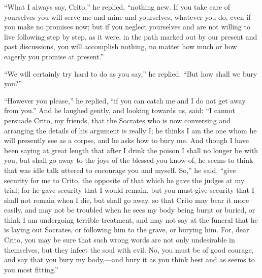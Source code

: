 \documentclass[letterpaper,12pt]{article}
\newcommand{\stephpag}[1]{\marginnote{\small\itshape\fontfamily{ppl}\selectfont #1}}
\begin{document}
\begin{drama}
``What I always say, Crito,'' he replied, ``nothing new. If you take care of yourselves you will serve me and mine and yourselves, whatever you do, even if you make no promises now; but if you neglect yourselves and are not willing to live following step by step, as it were, in the path marked out by our present and past discussions, you will accomplish nothing, \stephpag{c} no matter how much or how eagerly you promise at present.''
 
``We will certainly try hard to do as you say,'' he replied. ``But how shall we bury you?''
 
``However you please,'' he replied, ``if you can catch me and I do not get away from you.'' And he laughed gently, and looking towards us, said: ``I cannot persuade Crito, my friends, that the Socrates who is now conversing and arranging the details of his argument is really I; he thinks I am the one whom he will presently see as a corpse, \stephpag{d} and he asks how to bury me. And though I have been saying at great length that after I drink the poison I shall no longer be with you, but shall go away to the joys of the blessed you know of, he seems to think that was idle talk uttered to encourage you and myself. So,'' he said, ``give security for me to Crito, the opposite of that which he gave the judges at my trial; for he gave security that I would remain, but you must give security that I shall not remain when I die, \stephpag{e} but shall go away, so that Crito may bear it more easily, and may not be troubled when he sees my body being burnt or buried, or think I am undergoing terrible treatment, and may not say at the funeral that he is laying out Socrates, or following him to the grave, or burying him. For, dear Crito, you may be sure that such wrong words are not only undesirable in themselves, but they infect the soul with evil. No, you must be of good courage, and say that you bury my body,---and bury it \stephpag{116 a} as you think best and as seems to you most fitting.''
 

\end{drama}
\end{document}
